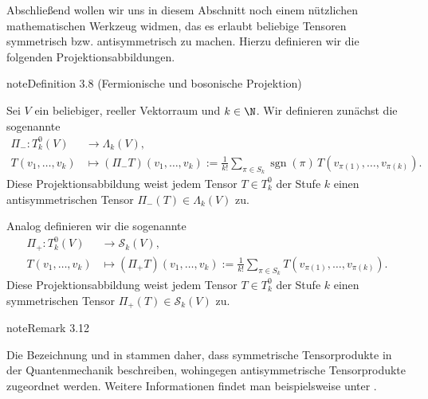 \documentclass[letterpaper,10pt,english]{jupyterBook}
\begin{document}
\sphinxAtStartPar
Abschließend wollen wir uns in diesem Abschnitt noch einem nützlichen mathematischen Werkzeug widmen, das es erlaubt beliebige Tensoren symmetrisch bzw. antisymmetrisch zu machen.
Hierzu definieren wir die folgenden Projektionsabbildungen.
\label{vektoranalysis/tensor:def:fermionischeProjektion}
\begin{sphinxadmonition}{note}{Definition 3.8 (Fermionische und bosonische Projektion)}



\sphinxAtStartPar
Sei \(V\) ein beliebiger, reeller Vektorraum und \(k \in \N\).
Wir definieren zunächst die sogenannte 
\begin{equation*}
\begin{split}\Pi_- \colon T_k^0(V) &\rightarrow \Lambda_k(V), \\
T(v_1, \ldots, v_k) &\mapsto (\Pi_- T)(v_1, \ldots, v_k) := \frac{1}{k!} \sum_{\pi \in S_k} \operatorname{sgn}(\pi) \, T(v_{\pi(1)}, \ldots, v_{\pi(k)}).\end{split}
\end{equation*}
\sphinxAtStartPar
Diese Projektionsabbildung weist jedem Tensor \(T\in T_k^0\) der Stufe \(k\) einen antisymmetrischen Tensor \(\Pi_-(T) \in \Lambda_k(V)\) zu.

\sphinxAtStartPar
Analog definieren wir die sogenannte 
\begin{equation*}
\begin{split}\Pi_+ \colon T_k^0(V) &\rightarrow \mathcal{S}_k(V), \\
T(v_1, \ldots, v_k) &\mapsto (\Pi_+ T)(v_1, \ldots, v_k) := \frac{1}{k!} \sum_{\pi \in S_k} T(v_{\pi(1)}, \ldots, v_{\pi(k)}).\end{split}
\end{equation*}
\sphinxAtStartPar
Diese Projektionsabbildung weist jedem Tensor \(T\in T_k^0\) der Stufe \(k\) einen symmetrischen Tensor \(\Pi_+(T) \in \mathcal{S}_k(V)\) zu.
\end{sphinxadmonition}
\label{vektoranalysis/tensor:remark-32}
\begin{sphinxadmonition}{note}{Remark 3.12}



\sphinxAtStartPar
Die Bezeichnung  und  in {\hyperref[\detokenize{vektoranalysis/tensor:def:fermionischeProjektion}]{}} stammen daher, dass symmetrische Tensorprodukte  in der Quantenmechanik beschreiben, wohingegen antisymmetrische Tensorprodukte  zugeordnet werden. Weitere Informationen findet man beispielsweise unter .
\end{sphinxadmonition}
\end{document}
